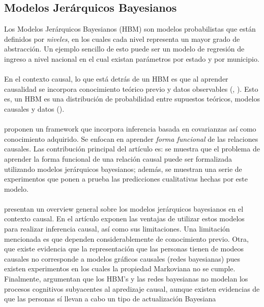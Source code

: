 \documentclass[11pt]{article}
\theoremstyle{plain}
\begin{document}
\subsection{Modelos Jerárquicos Bayesianos}
Los Modelos Jerárquicos Bayesianos (HBM) son modelos probabilistas que están definidos por \textit{niveles}, en los cuales cada nivel representa un mayor grado de abstracción. Un ejemplo sencillo de esto puede ser un modelo de regresión de ingreso a nivel nacional en el cual existan parámetros por estado y por municipio.\\
\\
En el contexto causal, lo que está detrás de un HBM es que al aprender causalidad se incorpora conocimiento teórico previo y datos observables (\cite{griffiths2005structure}, \cite{griffiths2009theory}). Esto es, un HBM es una distribución de probabilidad entre supuestos teóricos, modelos causales y datos (\cite{hagmayer2013hierarchical}).\\
\\
\cite{lucas2010learning} proponen un framework que incorpora inferencia basada en covarianzas así como conocimiento adquirido. Se enfocan en aprender  \textit{forma funcional} de las relaciones causales. Las contribución principal del artículo es: se muestra que el problema de aprender la forma funcional de una relación causal puede ser formalizada utilizando modelos jerárquicos bayesianos; además, se muestran una serie de experimentos que ponen a prueba las predicciones cualitativas hechas por este modelo.\\
\\
\cite{hagmayer2013hierarchical} presentan un overview general sobre los modelos jerárquicos bayesianos en el contexto causal. En el artículo exponen las ventajas de utilizar estos modelos para realizar inferencia causal, así como sus limitaciones. Una limitación mencionada es que dependen considerablemente de conocimiento previo. Otra, que existe evidencia que la representación que las personas tienen de modeos causales no corresponde a modelos gráficos causales (redes bayesianas) pues existen experimentos en los cuales la propiedad Markoviana no se cumple. Finalmente, argumentan que los HBM's y las redes bayesianas no modelan los procesos cognitivos subyacentes al apredizaje causal, aunque existen evidencias de que las personas sí llevan a cabo un tipo de actualización Bayesiana


\end{document}
